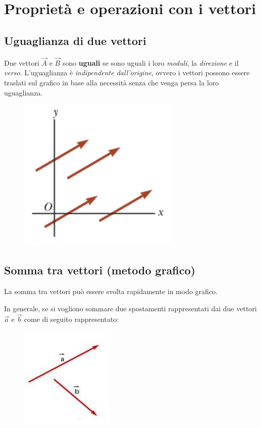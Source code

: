 \documentclass[a4paper,11pt,oneside]{book}
\begin{document}
\newpage
\section{Proprietà e operazioni con i vettori}
\subsection{Uguaglianza di due vettori}
Due vettori $\vec{A}$ e $\vec{B}$ sono \textbf{uguali} se sono uguali i loro \emph{moduli}, la \emph{direzione} e il \emph{verso}.
L'uguaglianza è \emph{indipendente dall'origine}, ovvero i vettori possono essere traslati sul grafico in base alla necessità
senza che venga persa la loro uguaglianza.
\begin{figure}[h]
    \includegraphics[scale=0.5]{uguaglianza_vettori}
    \centering
\end{figure}

\subsection{Somma tra vettori (metodo grafico)}
La somma tra vettori può essere svolta rapidamente in modo grafico.

In generale, se si vogliono sommare due spostamenti rappresentati dai due vettori $\vec{a}$ e $\vec{b}$ come di seguito rappresentato:
\begin{figure}[h]
    \includegraphics[scale=0.5]{vettori_da_sommare}
    \centering
\end{figure}
\end{document}
